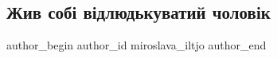  
 
 
 
 
 
\subsection{Жив собі відлюдькуватий чоловік}
\label{sec:08_08_2021.fb.miroslava_iltjo.1.chelovek_poezia}
 
\ifcmt
 author_begin
   author_id miroslava_iltjo
 author_end
\fi

